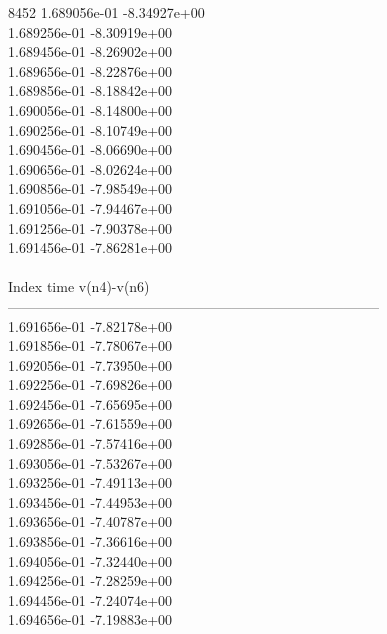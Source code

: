 8452	1.689056e-01	-8.34927e+00	\\ 	1.689256e-01	-8.30919e+00	\\ 	1.689456e-01	-8.26902e+00	\\ 	1.689656e-01	-8.22876e+00	\\ 	1.689856e-01	-8.18842e+00	\\ 	1.690056e-01	-8.14800e+00	\\ 	1.690256e-01	-8.10749e+00	\\ 	1.690456e-01	-8.06690e+00	\\ 	1.690656e-01	-8.02624e+00	\\ 	1.690856e-01	-7.98549e+00	\\ 	1.691056e-01	-7.94467e+00	\\ 	1.691256e-01	-7.90378e+00	\\ 	1.691456e-01	-7.86281e+00	\\ \hline
\\ \hline
Index   time            v(n4)-v(n6)     \\ \hline
--------------------------------------------------------------------------------\\ 	1.691656e-01	-7.82178e+00	\\ 	1.691856e-01	-7.78067e+00	\\ 	1.692056e-01	-7.73950e+00	\\ 	1.692256e-01	-7.69826e+00	\\ 	1.692456e-01	-7.65695e+00	\\ 	1.692656e-01	-7.61559e+00	\\ 	1.692856e-01	-7.57416e+00	\\ 	1.693056e-01	-7.53267e+00	\\ 	1.693256e-01	-7.49113e+00	\\ 	1.693456e-01	-7.44953e+00	\\ 	1.693656e-01	-7.40787e+00	\\ 	1.693856e-01	-7.36616e+00	\\ 	1.694056e-01	-7.32440e+00	\\ 	1.694256e-01	-7.28259e+00	\\ 	1.694456e-01	-7.24074e+00	\\ 	1.694656e-01	-7.19883e+00	\\ \hline
